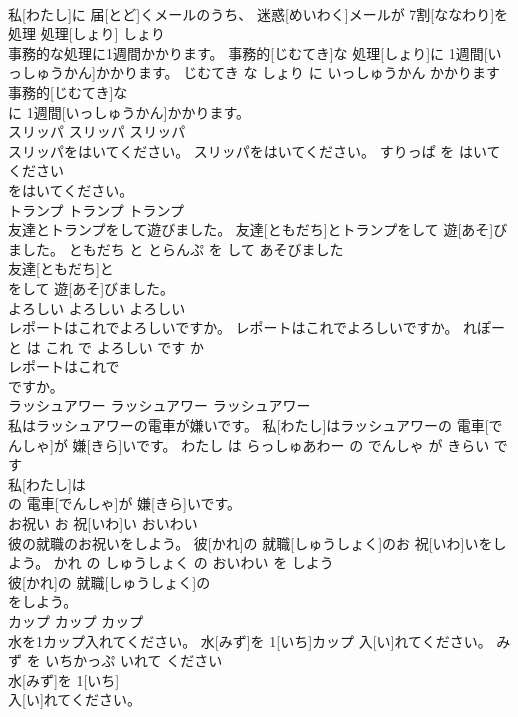 \documentclass[8pt]{extreport}
\begin{document}
\begin{CJK}{UTF8}{min}
\\	私[わたし]に 届[とど]くメールのうち、 迷惑[めいわく]メールが 7割[ななわり]を
\\	処理	処理[しょり]	しょり	
\\	事務的な処理に1週間かかります。	事務的[じむてき]な 処理[しょり]に 1週間[いっしゅうかん]かかります。	じむてき な しょり に いっしゅうかん かかります	
\\	事務的[じむてき]な
\\	に 1週間[いっしゅうかん]かかります。			
\\	スリッパ	スリッパ	スリッパ	
\\	スリッパをはいてください。	スリッパをはいてください。	すりっぱ を はいて ください	
\\	をはいてください。			
\\	トランプ	トランプ	トランプ	
\\	友達とトランプをして遊びました。	友達[ともだち]とトランプをして 遊[あそ]びました。	ともだち と とらんぷ を して あそびました	
\\	友達[ともだち]と
\\	をして 遊[あそ]びました。			
\\	よろしい	よろしい	よろしい	
\\	レポートはこれでよろしいですか。	レポートはこれでよろしいですか。	れぽーと は これ で よろしい です か	
\\	レポートはこれで
\\	ですか。			
\\	ラッシュアワー	ラッシュアワー	ラッシュアワー	
\\	私はラッシュアワーの電車が嫌いです。	私[わたし]はラッシュアワーの 電車[でんしゃ]が 嫌[きら]いです。	わたし は らっしゅあわー の でんしゃ が きらい です	
\\	私[わたし]は
\\	の 電車[でんしゃ]が 嫌[きら]いです。			
\\	お祝い	お 祝[いわ]い	おいわい	
\\	彼の就職のお祝いをしよう。	彼[かれ]の 就職[しゅうしょく]のお 祝[いわ]いをしよう。	かれ の しゅうしょく の おいわい を しよう	
\\	彼[かれ]の 就職[しゅうしょく]の
\\	をしよう。			
\\	カップ	カップ	カップ	
\\	水を1カップ入れてください。	水[みず]を 1[いち]カップ 入[い]れてください。	みず を いちかっぷ いれて ください	
\\	水[みず]を 1[いち]
\\	入[い]れてください。			

\end{CJK}
\end{document}
